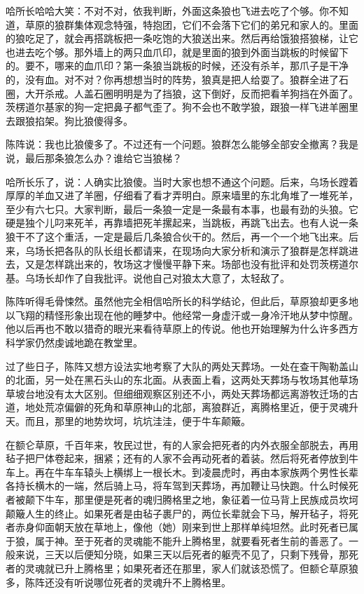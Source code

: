 \par 哈所长哈哈大笑：不对不对，依我判断，外面这条狼也飞进去吃了个够。你不知道，草原的狼群集体观念特强，特抱团，它们不会落下它们的弟兄和家人的。里面的狼吃足了，就会再搭跳板把一条吃饱的大狼送出来。然后再给饿狼搭狼梯，让它也进去吃个够。那外墙上的两只血爪印，就是里面的狼到外面当跳板的时候留下的。要不，哪来的血爪印？第一条狼当跳板的时候，还没有杀羊，那爪子是干净的，没有血。对不对？你再想想当时的阵势，狼真是把人给耍了。狼群全进了石圈，大开杀戒。人盖石圈明明是为了挡狼，这下倒好，反而把看羊狗挡在外面了。茨楞道尔基家的狗一定把鼻子都气歪了。狗不会也不敢学狼，跟狼一样飞进羊圈里去跟狼掐架。狗比狼傻得多。
\par 陈阵说：我也比狼傻多了。不过还有一个问题。狼群怎么能够全部安全撤离？我是说，最后那条狼怎么办？谁给它当狼梯？
\par 哈所长乐了，说：人确实比狼傻。当时大家也想不通这个问题。后来，乌场长蹚着厚厚的羊血又进了羊圈，仔细看了看才弄明白。原来墙里的东北角堆了一堆死羊，至少有六七只。大家判断，最后一条狼一定是一条最有本事，也最有劲的头狼。它硬是独个儿叼来死羊，再靠墙把死羊摞起来，当跳板，再跳飞出去。也有人说一条狼干不了这个重活，一定是最后几条狼合伙干的。然后，再一个一个地飞出来。后来，乌场长把各队的队长组长都请来，在现场向大家分析和演示了狼群是怎样跳进去，又是怎样跳出来的，牧场这才慢慢平静下来。场部也没有批评和处罚茨楞道尔基。乌场长却作了自我批评。说他自己对狼太大意了，太轻敌了。
\par 陈阵听得毛骨悚然。虽然他完全相信哈所长的科学结论，但此后，草原狼却更多地以飞翔的精怪形象出现在他的睡梦中。他经常一身虚汗或一身冷汗地从梦中惊醒。他以后再也不敢以猎奇的眼光来看待草原上的传说。他也开始理解为什么许多西方科学家仍然虔诚地跪在教堂里。
\par 
\par 过了些日子，陈阵又想方设法实地考察了大队的两处天葬场。一处在查干陶勒盖山的北面，另一处在黑石头山的东北面。从表面上看，这两处天葬场与牧场其他草场草坡台地没有太大区别。但细细观察区别还不小，两处天葬场都远离游牧迁场的古道，地处荒凉偏僻的死角和草原神山的北部，离狼群近，离腾格里近，便于灵魂升天。而且，那里的地势坎坷，坑坑洼洼，便于牛车颠簸。
\par 在额仑草原，千百年来，牧民过世，有的人家会把死者的内外衣服全部脱去，再用毡子把尸体卷起来，捆紧；还有的人家不会再动死者的着装。然后将死者停放到牛车上。再在牛车车辕头上横绑上一根长木。到凌晨虎时，再由本家族两个男性长辈各持长横木的一端，然后骑上马，将车驾到天葬场，再加鞭让马快跑。什么时候死者被颠下牛车，那里便是死者的魂归腾格里之地，象征着一位马背上民族成员坎坷颠簸人生的终止。如果死者是由毡子裹尸的，两位长辈就会下马，解开毡子，将死者赤身仰面朝天放在草地上，像他（她）刚来到世上那样单纯坦然。此时死者已属于狼，属于神。至于死者的灵魂能不能升上腾格里，就要看死者生前的善恶了。一般来说，三天以后便知分晓，如果三天以后死者的躯壳不见了，只剩下残骨，那死者的灵魂就已升上腾格里；如果死者还在那里，家人们就该恐慌了。但额仑草原狼多，陈阵还没有听说哪位死者的灵魂升不上腾格里。
